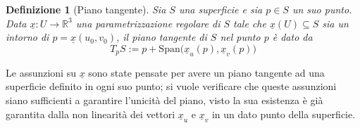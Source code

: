 \documentclass[12pt]{scrartcl}
\theoremstyle{style}
\newtheorem{definizione}{Definizione}[section]
\numberwithin{equation}{subsection}
\begin{document}
\begin{definizione}
	[Piano tangente]
	Sia $S$ una superficie e sia $p \in S$ un suo punto.
	Data $\underline{x}:U\to \mathbb{R}^3$ una parametrizzazione regolare di $S$ tale che $\underline{x}(U)\subseteq S$ sia un intorno di $p = \underline{x}(u_0,v_0)$, il piano tangente di $S$ nel punto $p$ \`e dato da
	\[
	T _p S := p + \mathrm{Span} \big(\underline{x}_u (p) , \underline{x}_v(p)\big)
	\] 
\end{definizione}
\noindent Le assunzioni su $\underline{x}$ sono state pensate per avere un piano tangente ad una superficie definito in ogni suo punto; si vuole verificare che queste assunzioni siano sufficienti a garantire l'unicit\`a del piano, visto la sua esistenza \`e gi\`a garantita dalla non linearit\`a dei vettori $\underline{x}_u$ e $\underline{x}_v$ in un dato punto della superficie.
\end{document}
